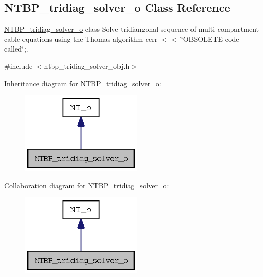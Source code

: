 \subsection{NTBP\_\-tridiag\_\-solver\_\-o Class Reference}
\label{class_n_t_b_p__tridiag__solver__o}


\hyperlink{class_n_t_b_p__tridiag__solver__o}{NTBP\_\-tridiag\_\-solver\_\-o} class Solve tridiangonal sequence of multi-\/compartment cable equations using the Thomas algorithm cerr $<$$<$ \char`\"{}OBSOLETE code called\char`\"{};.  




{\ttfamily \#include $<$ntbp\_\-tridiag\_\-solver\_\-obj.h$>$}



Inheritance diagram for NTBP\_\-tridiag\_\-solver\_\-o:
\nopagebreak
\begin{figure}[H]
\begin{center}
\leavevmode
\includegraphics[width=166pt]{class_n_t_b_p__tridiag__solver__o__inherit__graph}
\end{center}
\end{figure}


Collaboration diagram for NTBP\_\-tridiag\_\-solver\_\-o:
\nopagebreak
\begin{figure}[H]
\begin{center}
\leavevmode
\includegraphics[width=166pt]{class_n_t_b_p__tridiag__solver__o__coll__graph}
\end{center}
\end{figure}

